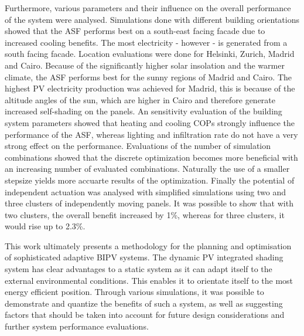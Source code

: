 Furthermore, various parameters and their influence on the overall performance of the system were analysed. Simulations done with different building orientations showed that the ASF performs best on a south-east facing facade due to increased cooling benefits. The most electricity - however - is generated from a south facing facade. Location evaluations were done for Helsinki, Zurich, Madrid and Cairo. Because of the significantly higher solar insolation and the warmer climate, the ASF performs best for the sunny regions of Madrid and Cairo. The highest PV electricity production was achieved for Madrid, this is because of the altitude angles of the sun, which are higher in Cairo and therefore generate increased self-shading on the panels. An sensitivity evaluation of the building system parameters showed that heating and cooling COPs strongly influence the performance of the ASF, whereas lighting and infiltration rate do not have a very strong effect on the performance. Evaluations of the number of simulation combinations showed that the discrete optimization becomes more beneficial with an increasing number of evaluated combinations. Naturally the use of a smaller stepsize yields more accuarte results of the optimization. Finally the potential of independent actuation was analysed with simplified simulations using two and three clusters of independently moving panels. It was possible to show that with two clusters, the overall benefit increased by 1\%, whereas for three clusters, it would rise up to 2.3\%. 

This work ultimately presents a methodology for the planning and optimisation of sophisticated adaptive BIPV systems. The dynamic PV integrated shading system has clear advantages to a static system as it can adapt itself to the external environmental conditions. This enables it to orientate itself to the most energy efficient position. Through various simulations, it was possible to demonstrate and quantize the benefits of such a system, as well as suggesting factors that should be taken into account for future design considerations and further system performance evaluations. 